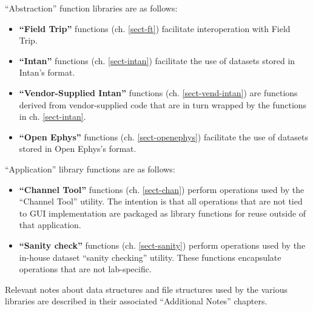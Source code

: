 \clearpage
``Abstraction'' function libraries are as follows:

\begin{itemize}
%
\item \textbf{``Field Trip''} functions (ch. \ref{sect-ft}) facilitate
interoperation with Field Trip.
%
\item \textbf{``Intan''} functions (ch. \ref{sect-intan}) facilitate the use
of datasets stored in Intan's format.
%
\item \textbf{``Vendor-Supplied Intan''} functions
(ch. \ref{sect-vend-intan}) are functions derived from vendor-supplied code
that are in turn wrapped by the functions in ch. \ref{sect-intan}.
%
\item \textbf{``Open Ephys''} functions (ch. \ref{sect-openephys})
facilitate the use of datasets stored in Open Ephys's format.
%
\end{itemize}

``Application'' library functions are as follows:

\begin{itemize}
%
\item \textbf{``Channel Tool''} functions (ch. \ref{sect-chan}) perform
operations used by the ``Channel Tool'' utility. The intention is that all
operations that are not tied to GUI implementation are packaged as library
functions for reuse outside of that application.
%
\item \textbf{``Sanity check''} functions (ch. \ref{sect-sanity}) perform
operations used by the in-house dataset ``sanity checking'' utility. These
functions encapsulate operations that are not lab-specific.
%
\end{itemize}

Relevant notes about data structures and file structures used by the
various libraries are described in their associated ``Additional Notes''
chapters.

%
